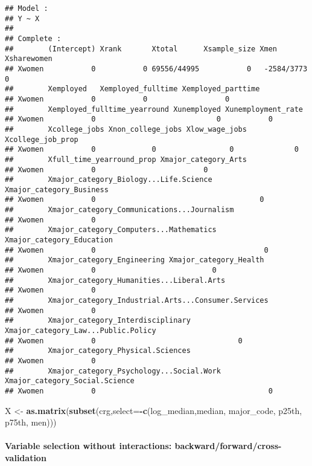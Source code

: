 \documentclass[
]{article}
\newenvironment{Shaded}{\begin{snugshade}}{\end{snugshade}}
\newcommand{\DataTypeTok}[1]{\textcolor[rgb]{0.13,0.29,0.53}{#1}}
\newcommand{\KeywordTok}[1]{\textcolor[rgb]{0.13,0.29,0.53}{\textbf{#1}}}
\newcommand{\NormalTok}[1]{#1}
\newcommand{\OperatorTok}[1]{\textcolor[rgb]{0.81,0.36,0.00}{\textbf{#1}}}
\newcommand{\StringTok}[1]{\textcolor[rgb]{0.31,0.60,0.02}{#1}}
\begin{document}
\begin{verbatim}
## Model :
## Y ~ X
## 
## Complete :
##        (Intercept) Xrank       Xtotal      Xsample_size Xmen        Xsharewomen
## Xwomen           0           0 69556/44995           0   -2584/3773           0
##        Xemployed   Xemployed_fulltime Xemployed_parttime
## Xwomen           0           0                  0       
##        Xemployed_fulltime_yearround Xunemployed Xunemployment_rate
## Xwomen           0                            0           0       
##        Xcollege_jobs Xnon_college_jobs Xlow_wage_jobs Xcollege_job_prop
## Xwomen           0             0                 0              0      
##        Xfull_time_yearround_prop Xmajor_category_Arts
## Xwomen           0                         0         
##        Xmajor_category_Biology...Life.Science Xmajor_category_Business
## Xwomen           0                                      0             
##        Xmajor_category_Communications...Journalism
## Xwomen           0                                
##        Xmajor_category_Computers...Mathematics Xmajor_category_Education
## Xwomen           0                                       0              
##        Xmajor_category_Engineering Xmajor_category_Health
## Xwomen           0                           0           
##        Xmajor_category_Humanities...Liberal.Arts
## Xwomen           0                              
##        Xmajor_category_Industrial.Arts...Consumer.Services
## Xwomen           0                                        
##        Xmajor_category_Interdisciplinary Xmajor_category_Law...Public.Policy
## Xwomen           0                                 0                        
##        Xmajor_category_Physical.Sciences
## Xwomen           0                      
##        Xmajor_category_Psychology...Social.Work Xmajor_category_Social.Science
## Xwomen           0                                        0
\end{verbatim}

\begin{Shaded}
\begin{Highlighting}[]
\NormalTok{X <-}\StringTok{ }\KeywordTok{as.matrix}\NormalTok{(}\KeywordTok{subset}\NormalTok{(crg,}\DataTypeTok{select=}\OperatorTok{-}\KeywordTok{c}\NormalTok{(log_median,median, major_code, p25th, p75th,  men)))}
\end{Highlighting}
\end{Shaded}

\hypertarget{variable-selection-without-interactions-backwardforwardcross-validation}{%
\paragraph{Variable selection without interactions:
backward/forward/cross-validation}\label{variable-selection-without-interactions-backwardforwardcross-validation}}
\end{document}
